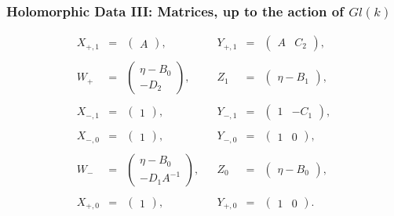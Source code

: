 \documentclass[12pt]{article}
\theoremstyle{definition}
\theoremstyle{remark}
\numberwithin{theorem}{section}
\begin{document}
 \subsubsection{Holomorphic Data III: Matrices, up to the action of $Gl(k)$} 
\begin{equation}
\begin{matrix}
X_{+,1}&= & \begin{pmatrix}A \end{pmatrix},&&Y_{+,1}&=& \begin{pmatrix}A&C_2 \end{pmatrix},\\ \\
W_+&=& \begin{pmatrix}\eta-B_0\\-D_2\end{pmatrix},&&Z_1 &=&\begin{pmatrix}\eta-B_1\end{pmatrix},\\ \\
X_{-,1}&=& \begin{pmatrix}1 \end{pmatrix},&& Y_{-,1}&=& \begin{pmatrix}1& -C_1 \end{pmatrix},
 \\ \\
X_{-,0}&=& \begin{pmatrix}1 \end{pmatrix},&&Y_{-,0}&=& \begin{pmatrix}1& 0\end{pmatrix},\\ \\
W_-&=& \begin{pmatrix}\eta-B_0 \\  -D_1 A^{-1}\end{pmatrix},&&Z_0&=&\begin{pmatrix}\eta-B_0\end{pmatrix},\\ \\
X_{+,0}&= &\begin{pmatrix}1 \end{pmatrix},&&Y_{+,0}&=& \begin{pmatrix}1&0\end{pmatrix}.\end{matrix}\label{matrices-caloron-2}\end{equation}
\end{document}
